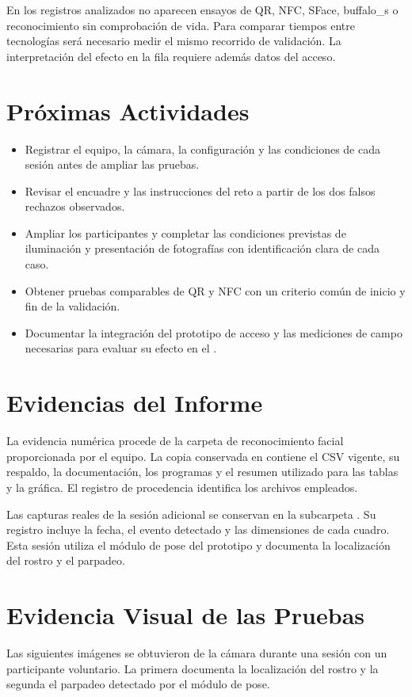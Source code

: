 En los registros analizados no aparecen ensayos de QR, NFC, SFace,
buffalo\_s o reconocimiento sin comprobación de vida. Para comparar tiempos
entre tecnologías será necesario medir el mismo recorrido de validación.
La interpretación del efecto en la fila requiere además datos del acceso.

\section{Próximas Actividades}
\begin{itemize}
\item Registrar el equipo, la cámara, la configuración y las condiciones de
cada sesión antes de ampliar las pruebas.
\item Revisar el encuadre y las instrucciones del reto a partir de los dos
falsos rechazos observados.
\item Ampliar los participantes y completar las condiciones previstas de
iluminación y presentación de fotografías con identificación clara de cada caso.
\item Obtener pruebas comparables de QR y NFC con un criterio común de
inicio y fin de la validación.
\item Documentar la integración del prototipo de acceso y las mediciones de
campo necesarias para evaluar su efecto en el \tescha{}.
\end{itemize}

\section{Evidencias del Informe}
La evidencia numérica procede de la carpeta de reconocimiento facial
proporcionada por el equipo. La copia conservada en
 contiene el CSV vigente, su respaldo,
la documentación, los programas y el resumen utilizado para las tablas y la
gráfica. El registro de procedencia identifica los archivos empleados.

Las capturas reales de la sesión adicional se conservan en la subcarpeta
. Su registro incluye la fecha, el evento detectado y las
dimensiones de cada cuadro. Esta sesión utiliza el módulo de pose del
prototipo y documenta la localización del rostro y el parpadeo.

\clearpage
\section{Evidencia Visual de las Pruebas}
Las siguientes imágenes se obtuvieron de la cámara durante una sesión con
un participante voluntario. La primera documenta la localización del rostro
y la segunda el parpadeo detectado por el módulo de pose.

